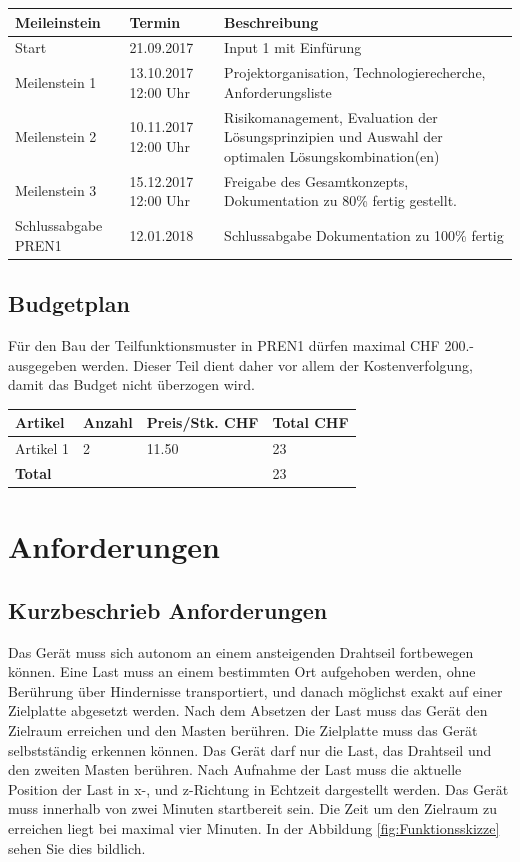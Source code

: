 \documentclass[a4paper]{report}
\begin{document}
\vspace{1em}
\noindent
\begin{tabular}{|p{}|p{}|p{}|}
	\hline
	\textbf{Meileinstein} & \textbf{Termin} & \textbf{Beschreibung} \\
	\hline
	Start & 21.09.2017 & Input 1 mit Einfürung \\
	\hline
	Meilenstein 1 & 13.10.2017 12:00 Uhr & Projektorganisation, Technologierecherche, Anforderungsliste \\
	\hline
	Meilenstein 2 & 10.11.2017 12:00 Uhr & Risikomanagement, Evaluation der Lösungsprinzipien und Auswahl der optimalen Lösungskombination(en) \\
	\hline
	Meilenstein 3 & 15.12.2017 12:00 Uhr & Freigabe des Gesamtkonzepts, Dokumentation zu 80\% fertig gestellt. \\
	\hline
	Schlussabgabe PREN1 &12.01.2018 & Schlussabgabe Dokumentation zu 100\% fertig \\
	\hline
\end{tabular}

\section{Budgetplan}
Für den Bau der Teilfunktionsmuster in PREN1 dürfen maximal CHF 200.- ausgegeben werden. Dieser Teil dient daher vor allem der Kostenverfolgung, damit das Budget nicht überzogen wird.

\vspace{1em}
\noindent
\begin{tabular}{|p{}|p{}|p{}|p{}|}
	\hline
	\textbf{Artikel} & \textbf{Anzahl} & \textbf{Preis/Stk. CHF} & \textbf{Total CHF} \\
	\hline
	Artikel 1 & 2 & 11.50 & 23 \\
	\hline
	\textbf{Total} & & & 23 \\
	\hline
\end{tabular}


\chapter{Anforderungen}
\section{Kurzbeschrieb Anforderungen}
Das Gerät muss sich autonom an einem ansteigenden Drahtseil fortbewegen können. Eine Last muss an einem bestimmten Ort aufgehoben werden, ohne Berührung über Hindernisse transportiert, und danach möglichst exakt auf einer Zielplatte abgesetzt werden. Nach dem Absetzen der Last muss das Gerät den Zielraum erreichen und den Masten berühren. Die Zielplatte muss das Gerät selbstständig erkennen können. Das Gerät darf nur die Last, das Drahtseil und den zweiten Masten berühren. Nach Aufnahme der Last muss die aktuelle Position der Last in x-, und z-Richtung in Echtzeit dargestellt werden. Das Gerät muss innerhalb von zwei Minuten startbereit sein. Die Zeit um den Zielraum zu erreichen liegt bei maximal vier Minuten. In der Abbildung \ref{fig:Funktionsskizze} sehen Sie dies bildlich.
\end{document}
